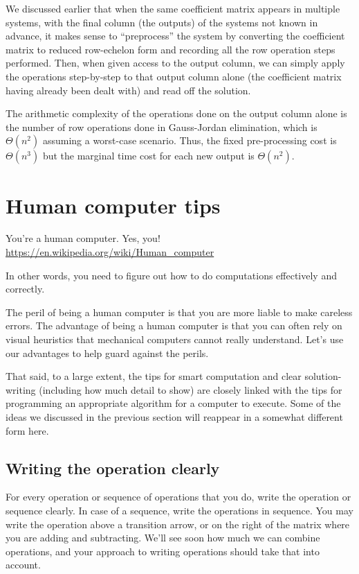 \documentclass[10pt]{amsart}
\begin{document}
We discussed earlier that when the same coefficient matrix appears in
multiple systems, with the final column (the outputs) of the systems
not known in advance, it makes sense to ``preprocess'' the system by
converting the coefficient matrix to reduced row-echelon form and
recording all the row operation steps performed. Then, when given
access to the output column, we can simply apply the operations
step-by-step to that output column alone (the coefficient matrix
having already been dealt with) and read off the solution.

The arithmetic complexity of the operations done on the output column
alone is the number of row operations done in Gauss-Jordan
elimination, which is $\Theta(n^2)$ assuming a worst-case
scenario. Thus, the fixed pre-processing cost is $\Theta(n^3)$ but the
marginal time cost for each new output is $\Theta(n^2)$.

\section{Human computer tips}

You're a human computer. Yes, you!
\url{https://en.wikipedia.org/wiki/Human_computer}

In other words, you need to figure out how to do computations
effectively and correctly.

The peril of being a human computer is that you are more liable to
make careless errors. The advantage of being a human computer is that
you can often rely on visual heuristics that mechanical computers
cannot really understand. Let's use our advantages to help guard
against the perils.

That said, to a large extent, the tips for smart computation and clear
solution-writing (including how much detail to show) are closely
linked with the tips for programming an appropriate algorithm for a
computer to execute. Some of the ideas we discussed in the previous
section will reappear in a somewhat different form here.

\subsection{Writing the operation clearly}

For every operation or sequence of operations that you do, write the
operation or sequence clearly. In case of a sequence, write the
operations in sequence. You may write the operation above a transition
arrow, or on the right of the matrix where you are adding and
subtracting. We'll see soon how much we can combine operations, and
your approach to writing operations should take that into account.
\end{document}
